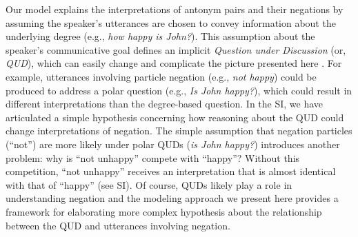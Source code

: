 \documentclass[floatsintext,doc]{apa6}
\begin{document}
Our model explains the interpretations of antonym pairs and their negations by assuming the speaker's utterances are chosen to convey information about the underlying degree (e.g., \emph{how happy is John?}). This assumption about the speaker's communicative goal defines an implicit \emph{Question under Discussion} (or, \emph{QUD}), which can easily change and complicate the picture presented here  \cite{roberts2012information, beaver2017questions}. For example, utterances involving particle negation (e.g., \emph{not happy}) could be produced to address a polar question (e.g., \emph{Is John happy?}), which could result in different interpretations than the degree-based question. 
In the SI, we have articulated a simple hypothesis concerning how reasoning about the QUD could change interpretations of negation. 
The simple assumption that negation particles (``not'') are more likely under polar QUDs (\emph{is John happy?}) introduces another problem: why is ``not unhappy'' compete with ``happy''? Without this competition,  ``not unhappy'' receives an interpretation that is almost identical with that of ``happy'' (see SI).
Of course, QUDs likely play a role in understanding negation and the modeling approach we present here provides a framework for elaborating more complex hypothesis about the relationship between the QUD and utterances involving negation.

%
\end{document}
